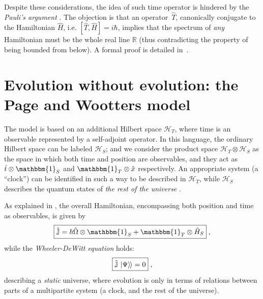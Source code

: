 \documentclass[a0,portrait]{a0poster}
\newcommand{\term}[1]{\emph{#1}}
\newcommand{\idop}{\mathbbm{1}}           %
\newcommand{\ox}{\otimes}
\newcommand{\smallback}{\hspace{-0.115em}}
\newcommand{\dket}[1]{\left.\left| #1 \right\rangle\smallback\right\rangle}
\begin{document}
\begin{multicols}{2}
Despite these considerations,
the idea of
such time operator
is hindered by the \emph{Pauli's argument} \cite{PauliFootnote}.
The objection
is that
an operator~$\hat{T}$,
canonically conjugate to the Hamiltonian $\hat{H}$,
i.e.
$
  \label{THcommutator}
  [\hat{T}, \hat{H}] = i\hbar
  \text{,}
$
implies that the spectrum of \emph{any} Hamiltonian must be the whole real line $\mathbb{R}$
(thus contradicting the property of being bounded from below).
A formal proof is detailed in~\cite{Galapon2002}.



\color{maincolor} %

\section*{Evolution without evolution: the Page and Wootters model}

The model \cite{Lloyd:Time, Maccone:Pauli} is based on
an additional Hilbert space $\mathcal{H}_T$,
where time is an observable
represented by a self-adjoint operator.
%
In this language, the ordinary Hilbert space can be labeled $\mathcal{H}_S$;
and we consider the product space $\mathcal{H}_T \otimes \mathcal{H}_S$ as
the space in which both time and position are observables, and they act as
$\hat{t} \otimes \idop_S$ and $\idop_T \otimes \hat{x}$
respectively.
%
An appropriate system (a ``clock'') can be identified in such a way
to be described in $\mathcal{H}_T$, while $\mathcal{H}_S$ describes
the quantum states of \emph{the rest of the universe} \cite{Marletto:Evolution}.

As explained in \cite{Lloyd:Time, Maccone:Pauli}, the overall Hamiltonian,
encompassing both position and time as observables, is given by
\begin{equation}\label{eq:pwHamiltonian}
    \boxed{\hat{\mathbb{J}} = \hbar\hat{\Omega}\ox\idop_S + \idop_T\ox\hat{H}_S}
    \;\text{,}
\end{equation}
while the \term{Wheeler-DeWitt equation} holds:
\begin{equation}\label{eq:Wheeler-DeWitt}
  \boxed{\hat{\mathbb{J}}\dket{\Psi} = 0}
  \;\text{,}
\end{equation}
describing a \emph{static} universe, where evolution is only
in terms of relations between parts of a multipartite system
(a clock, and the rest of the universe).


\end{multicols}
\end{document}
